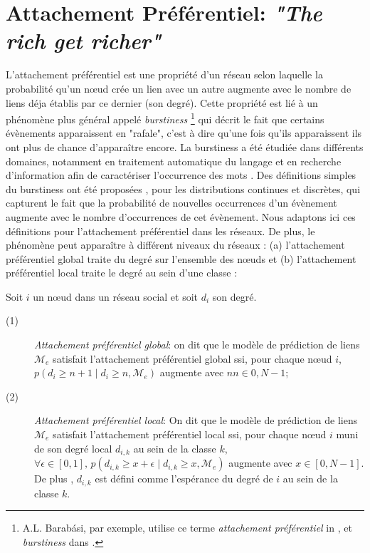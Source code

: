 \documentclass[french]{hermes-journal}
\newcommand{\pr}{p}
\begin{document}
\section{Attachement Préférentiel: \emph{"The rich get richer"}}
\label{sec:burstiness}


L'attachement préférentiel est une propriété d'un réseau selon laquelle la probabilité qu'un n\oe{}ud crée un lien avec un autre augmente avec le nombre de liens déja établis par ce dernier (son degré). Cette propriété est lié à un phénomène plus général appelé \textit{burstiness} \footnote{A.L. Barab\'asi, par exemple, utilise ce terme \textit{attachement préférentiel} in \cite{barabasi1999emergence}, et \textit{burstiness} dans \cite{barabasi_burst}.} qui décrit le fait que certains évènements apparaissent en "rafale", c'est à dire qu'une fois qu'ils apparaissent ils ont plus de chance d'apparaître encore. La burstiness a été étudiée dans différents domaines, notamment en traitement automatique du langage et en recherche d'information afin de caractériser l'occurrence des mots \cite{church1995poisson}. Des définitions simples du burstiness ont été proposées \cite{clinchant2008bnb,clinchant2010information}, pour les distributions continues et discrètes, qui capturent le fait que la probabilité de nouvelles occurrences d'un évènement augmente avec le nombre d'occurrences de cet évènement. Nous adaptons ici ces définitions pour l'attachement préférentiel dans les réseaux. De plus, le phénomène peut apparaître à différent niveaux du réseaux : (a) l'attachement préférentiel global traite du degré sur l'ensemble des n\oe{}uds et (b) l'attachement préférentiel local traite le degré au sein d'une classe :


\begin{definition}
Soit $i$ un n\oe{}ud dans un réseau social et soit $d_i$ son degré.
\begin{description}
    \item[(1)] \emph{Attachement préférentiel global}: on dit que le modèle de prédiction de liens $\mathcal{M}_e$ satisfait l'attachement préférentiel global ssi, pour chaque n\oe{}ud $i$, $\pr(d_i \ge n+1 \mid d_i \ge n, \mathcal{M}_e)$ augmente avec $n n \in {0, N-1}$;
 \item[(2)] \emph{Attachement préférentiel local}: On dit que le modèle de prédiction de liens  $\mathcal{M}_e$ satisfait l'attachement préférentiel local ssi, pour chaque n\oe{}ud $i$ muni de son degré local $d_{i,k}$  au sein de la classe $k$, $\forall \epsilon \in [0,1], \, \pr(d_{i,k} \ge x+\epsilon \mid d_{i,k} \ge x, \mathcal{M}_e)$  augmente avec $x \in [0,N-1]$. De plus , $d_{i,k}$ est défini comme l'espérance du degré de $i$ au sein de la classe $k$.
\end{description}
\label{def:burst-soc-net}
\end{definition}
\end{document}
